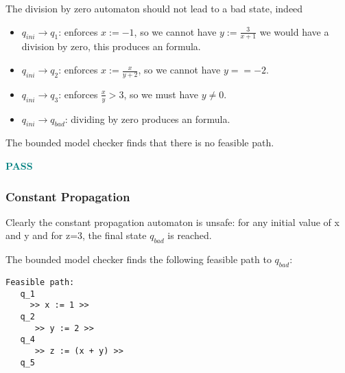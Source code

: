 \documentclass[letterpaper,12pt]{article}
\begin{document}
The division by zero automaton should not lead to a bad state, indeed 
\begin{itemize}
\item $q_{ini} \rightarrow q_1 $: enforces $x:=-1$, so we cannot have $y:=\frac{3}{x+1}$ we would have a division by zero, this produces an {} formula.
\item $q_{ini} \rightarrow q_2 $: enforces $x:=\frac{x}{y+2}$, so we cannot have $y==-2$.
\item $q_{ini} \rightarrow q_3 $: enforces $\frac{x}{y} > 3$, so we must have $y\neq 0$.
\item $q_{ini} \rightarrow q_{bad} $: dividing by zero produces an {} formula.
\end{itemize}  


The bounded model checker finds that there is no feasible path.

\textbf{\textcolor{teal}{PASS}}


\subsubsection{Constant Propagation}


Clearly the constant propagation automaton is unsafe: for any initial value of x and y and for z=3, the final state $q_{bad}$ is reached. 

The bounded model checker finds the following feasible path to $q_{bad}$:

\begin{verbatim}
Feasible path:
   q_1
     >> x := 1 >>
   q_2
      >> y := 2 >>
   q_4
      >> z := (x + y) >>
   q_5

\end{verbatim}
\end{document}
